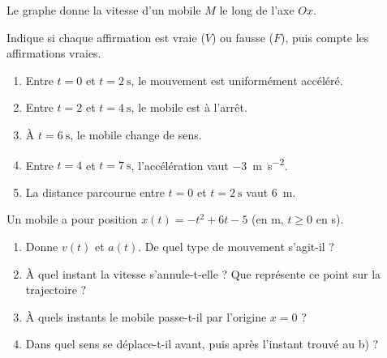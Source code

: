 \documentclass[11pt,a4paper]{article}
\begin{document}

\begin{exo}
Le graphe donne la vitesse d'un mobile $M$ le long de l'axe $Ox$.
\begin{center}
\end{center}
Indique si chaque affirmation est vraie ($V$) ou fausse ($F$), puis compte les affirmations vraies.
\begin{enumerate}[label=\alph*)]
  \item Entre $t=0$ et $t=\qty{2}{\second}$, le mouvement est uniformément accéléré.
  \item Entre $t=2$ et $t=\qty{4}{\second}$, le mobile est à l'arrêt.
  \item À $t=\qty{6}{\second}$, le mobile change de sens.
  \item Entre $t=4$ et $t=\qty{7}{\second}$, l'accélération vaut \qty{-3}{\metre\per\second\squared}.
  \item La distance parcourue entre $t=0$ et $t=\qty{2}{\second}$ vaut \qty{6}{\metre}.
\end{enumerate}
\end{exo}

\begin{exo}
Un mobile a pour position $x(t)=-t^2+6t-5$ (en \si{\metre}, $t\ge0$ en \si{\second}).
\begin{enumerate}[label=\alph*)]
  \item Donne $v(t)$ et $a(t)$. De quel type de mouvement s'agit-il ?
  \item À quel instant la vitesse s'annule-t-elle ? Que représente ce point sur la trajectoire ?
  \item À quels instants le mobile passe-t-il par l'origine $x=0$ ?
  \item Dans quel sens se déplace-t-il avant, puis après l'instant trouvé au b) ?
\end{enumerate}
\end{exo}
\end{document}
